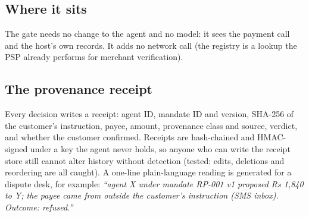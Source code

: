 \documentclass[10pt,a4paper]{article}
\begin{document}
\subsection{Where it sits}
\begin{center}
\end{center}
The gate needs no change to the agent and no model: it sees the payment call and the host's own records. It adds no
network call (the registry is a lookup the PSP already performs for merchant verification).

\subsection{The provenance receipt}
Every decision writes a receipt: agent ID, mandate ID and version, SHA-256 of the customer's instruction, payee, amount,
provenance class and source, verdict, and whether the customer confirmed. Receipts are hash-chained and HMAC-signed under a
key the agent never holds, so anyone who can write the receipt store still cannot alter history without detection (tested:
edits, deletions and reordering are all caught). A one-line plain-language reading is generated for a dispute desk, for
example: \emph{``agent X under mandate RP-001 v1 proposed Rs 1,840 to Y; the payee came from outside the customer's
instruction (SMS inbox). Outcome: refused.''}
\end{document}
